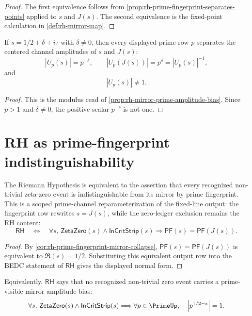 \begin{proof}
The first equivalence follows from
\autoref{prop:rh-prime-fingerprint-separates-points} applied to $s$ and
$J(s)$.  The second equivalence is the fixed-point calculation in
\autoref{def:rh-mirror-map}.
\end{proof}

\begin{corollary}
\label{cor:rh-off-critical-mirror-pairs-prime-visible}
If $s=1/2+\delta+i\tau$ with $\delta\neq0$, then every displayed prime row
$p$ separates the centered channel amplitudes of $s$ and $J(s)$:
$$
\left|U_p(s)\right|=p^{-\delta},
\qquad
\left|U_p(J(s))\right|=p^\delta
=\left|U_p(s)\right|^{-1},
$$
and
$$
\left|U_p(s)\right|\neq1.
$$
\end{corollary}

\begin{proof}
This is the modulus read of
\autoref{prop:rh-mirror-prime-amplitude-bias}.  Since $p>1$ and
$\delta\neq0$, the positive scalar $p^{-\delta}$ is not one.
\end{proof}

\section{RH as prime-fingerprint indistinguishability}
\label{sec:rh-prime-fingerprint-rh}

\begin{theorem}
\label{thm:rh-prime-fingerprint-normal-form}
The Riemann Hypothesis is equivalent to the assertion that every recognized
non-trivial zeta-zero event is indistinguishable from its mirror by prime
fingerprint. This is a scoped prime-channel reparameterization of the
fixed-line output: the fingerprint row rewrites $s=J(s)$, while the
zero-ledger exclusion remains the RH content:
$$
\mathsf{RH}
\quad\Longleftrightarrow\quad
\forall s,\,
\mathsf{ZetaZero}(s)\wedge\mathsf{InCritStrip}(s)
\Longrightarrow
\mathsf{PF}(s)=\mathsf{PF}(J(s)).
$$
\end{theorem}

\begin{proof}
By \autoref{cor:rh-prime-fingerprint-mirror-collapse},
$\mathsf{PF}(s)=\mathsf{PF}(J(s))$ is equivalent to
$\Re(s)=1/2$.  Substituting this equivalent output row into the BEDC
statement of $\mathsf{RH}$ gives the displayed normal form.
\end{proof}

\begin{corollary}
\label{cor:rh-no-prime-visible-mirror-bias-form}
Equivalently, $\mathsf{RH}$ says that no recognized non-trivial zero event
carries a prime-visible mirror amplitude bias:
$$
\forall s,\,
\mathsf{ZetaZero}(s)\wedge\mathsf{InCritStrip}(s)
\Longrightarrow
\forall p\in\PrimeUp,\quad
\left|p^{1/2-s}\right|=1.
$$
\end{corollary}

